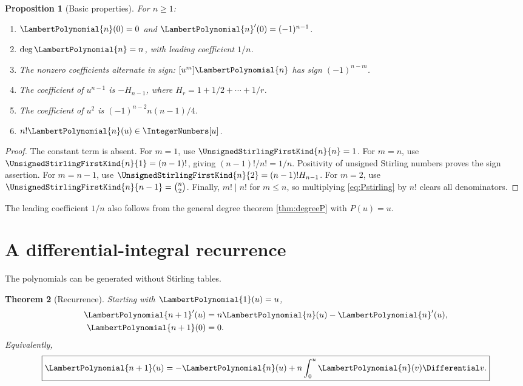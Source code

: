\documentclass[11pt,oneside,openany]{book}
\newtheorem{theorem}{Theorem}[chapter]
\newtheorem{proposition}[theorem]{Proposition}
\begin{document}
\begin{proposition}[Basic properties]\label{prop:Pproperties}
For \(n\geq1\):
\begin{enumerate}
\item \(\LambertPolynomial{n}(0)=0\) and \({\LambertPolynomial{n}}'(0)=(-1)^{n-1}\).
\item \(\deg \LambertPolynomial{n}=n\), with leading coefficient \(1/n\).
\item The nonzero coefficients alternate in sign:
\([u^m]\LambertPolynomial{n}\) has sign \((-1)^{n-m}\).
\item The coefficient of \(u^{n-1}\) is \(-H_{n-1}\), where
\(H_r=1+1/2+\cdots+1/r\).
\item The coefficient of \(u^2\) is
\((-1)^{n-2}n(n-1)/4\).
\item \(n!\LambertPolynomial{n}(u)\in\IntegerNumbers[u]\).
\end{enumerate}
\end{proposition}

\begin{proof}
The constant term is absent.  For \(m=1\), use
\(\UnsignedStirlingFirstKind{n}{n}=1\).  For \(m=n\), use
\(\UnsignedStirlingFirstKind{n}{1}=(n-1)!\), giving \((n-1)!/n!=1/n\).
Positivity of unsigned Stirling numbers proves the sign assertion.  For
\(m=n-1\), use
\(\UnsignedStirlingFirstKind{n}{2}=(n-1)!H_{n-1}\).  For \(m=2\), use
\(\UnsignedStirlingFirstKind{n}{n-1}=\binom n2\).  Finally, \(m!\mid n!\) for \(m\leq n\),
so multiplying \cref{eq:Pstirling} by \(n!\) clears all denominators.
\end{proof}

The leading coefficient \(1/n\) also follows from the general degree theorem
\cref{thm:degreeP} with \(P(u)=u\).

\section{A differential-integral recurrence}
The polynomials can be generated without Stirling tables.

\begin{theorem}[Recurrence]\label{thm:Precurrence}
Starting with \(\LambertPolynomial{1}(u)=u\),
\begin{align}
 {\LambertPolynomial{n+1}}'(u)&=n\LambertPolynomial{n}(u)-{\LambertPolynomial{n}}'(u),
 \label{eq:Pderivrec}\\
 \LambertPolynomial{n+1}(0)&=0.
 \label{eq:Pzero}
\end{align}
Equivalently,
\begin{equation}\label{eq:Pintegralrec}
 \boxed{
 \LambertPolynomial{n+1}(u)=-\LambertPolynomial{n}(u)+n\int_0^u\LambertPolynomial{n}(v)\Differential v.
 }
\end{equation}
\end{theorem}
\end{document}
